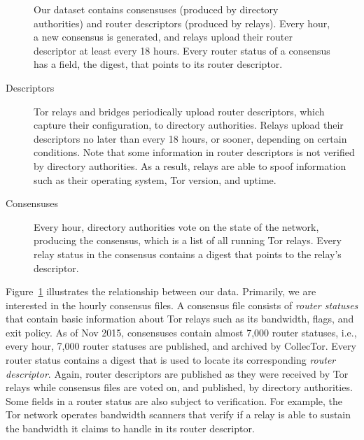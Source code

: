\begin{figure}[t]
\caption{Our dataset contains consensuses (produced by directory
	authorities) and router descriptors (produced by relays).  Every hour,
	a new consensus is generated, and relays upload their router descriptor
	at least every 18 hours.  Every router status of a consensus has a
	field, the digest, that points to its router descriptor.}
\label{fig:datasets}
\end{figure}

\begin{description}
	\item[Descriptors] Tor relays and bridges periodically upload router
		descriptors, which capture their configuration, to directory
		authorities.  Relays upload their descriptors no later than every 18
		hours, or sooner, depending on certain conditions.  Note that some
		information in router descriptors is not verified by directory
		authorities.  As a result, relays are able to spoof information such as
		their operating system, Tor version, and uptime.

	\item[Consensuses] Every hour, directory authorities vote on the state of
		the network, producing the consensus, which is a list of all running Tor
		relays.  Every relay status in the consensus contains a digest that
		points to the relay's descriptor.
\end{description}

Figure~\ref{fig:datasets} illustrates the relationship between our data.
Primarily, we are interested in the hourly consensus files.  A consensus file
consists of \emph{router statuses} that contain basic information about Tor
relays such as its bandwidth, flags, and exit policy.  As of Nov 2015,
consensuses contain almost 7,000 router statuses, i.e., every hour, 7,000 router
statuses are published, and archived by CollecTor.  Every router status contains
a digest that is used to locate its corresponding \emph{router descriptor}.
Again, router descriptors are published as they were received by Tor relays
while consensus files are voted on, and published, by directory authorities.
Some fields in a router status are also subject to verification.  For example,
the Tor network operates bandwidth scanners that verify if a relay is able to
sustain the bandwidth it claims to handle in its router descriptor.

